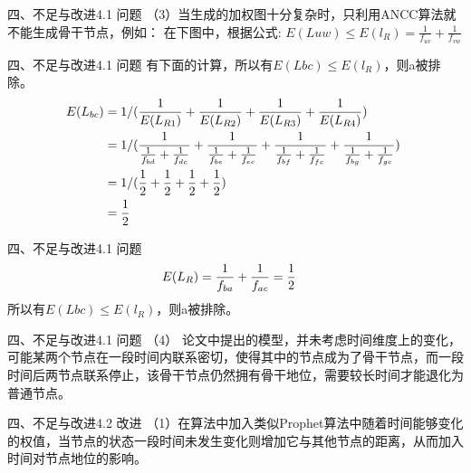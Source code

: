 \documentclass[12pt,aspectratio=43,table]{beamer}
\begin{document}
\begin{frame}{四、不足与改进}{4.1 问题}
（3）当生成的加权图十分复杂时，只利用ANCC算法就不能生成骨干节点，例如：
在下图中，根据公式: $E(L{uw})\le E(l_R)=\frac{1}{f_{uv}}+\frac{1}{f_{vw}}$
\begin{figure}
\end{figure}


\end{frame}

\begin{frame}{ 四、不足与改进}{4.1 问题}
有下面的计算，所以有$E(L{bc})\le E(l_R)$，则a被排除。
\begin{equation} \nonumber
$$\begin{align*} E(L_{bc})&=1/(\frac{1}{E(L_{R1})}+\frac{1}{E(L_{R2})}+\frac{1}{E(L_{R3})}+\frac{1}{E(L_{R4})})\nonumber  \\
 &=1/(\frac{1}{\frac{1}{f_{bd}}+\frac{1}{f_{dc}}} + \frac{1}{\frac{1}{f_{be}}+\frac{1}{f_{ec}}} + \frac{1}{\frac{1}{f_{bf}}+\frac{1}{f_{fc}}} + \frac{1}{\frac{1}{f_{bg}}+\frac{1}{f_{gc}}})\  \nonumber \\
&=1/(\frac{1}{2} + \frac{1}{2} + \frac{1}{2} + \frac{1}{2})\    \nonumber \\
&=\frac{1}{2} \nonumber
\end{align*}$$
\end{equation}
\end{frame}

\begin{frame}{ 四、不足与改进}{4.1 问题}
\begin{equation}
$$\begin{align*} E(L_R)=\frac{1}{f_{ba}} + \frac{1}{f_{ac}}&=\frac{1}{2} \nonumber
\end{align*} $$
\end{equation}
所以有$E(L{bc})\le E(l_R)$，则a被排除。
\end{frame}

\begin{frame}{四、不足与改进}{4.1 问题}
（4） 论文中提出的模型，并未考虑时间维度上的变化，可能某两个节点在一段时间内联系密切，使得其中的节点成为了骨干节点，而一段时间后两节点联系停止，该骨干节点仍然拥有骨干地位，需要较长时间才能退化为普通节点。
\end{frame}

\begin{frame}{ 四、不足与改进}{4.2 改进}
（1）在算法中加入类似Prophet算法中随着时间能够变化的权值，当节点的状态一段时间未发生变化则增加它与其他节点的距离，从而加入时间对节点地位的影响。
\end{frame}
\end{document}
